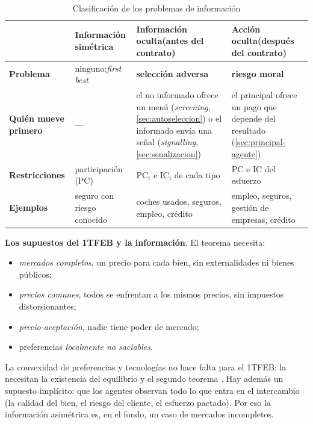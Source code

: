 \documentclass[11pt]{article}
\begin{document}
\begin{table}[H]
\centering
\caption{Clasificación de los problemas de información}\label{tab:clasificacion-informacion}
\begin{tabular}{>{\centering\arraybackslash}m{2.6cm}>{\centering\arraybackslash}m{3.4cm}>{\centering\arraybackslash}m{4.4cm}>{\centering\arraybackslash}m{4.4cm}}
\toprule
\rowcolor{tceeazulpalido} & \textbf{Información simétrica} & \textbf{Información oculta}\newline (antes del contrato) & \textbf{Acción oculta}\newline (después del contrato)\\
\midrule
\textbf{Problema} & ninguno:\newline \emph{first best} & \cellcolor{tceesalvia}\textcolor{tceeverde}{\textbf{selección adversa}} & \cellcolor{tceesalvia}\textcolor{tceedorado}{\textbf{riesgo moral}}\\
\addlinespace[0.3em]
\textbf{Quién mueve primero} & --- & el no informado ofrece un menú (\emph{screening}, \ref{sec:autoseleccion}) o el informado envía una señal (\emph{signalling}, \ref{sec:senalizacion}) & el principal ofrece un pago que depende del resultado (\ref{sec:principal-agente})\\
\addlinespace[0.3em]
\textbf{Restricciones} & participación (PC) & $\mathrm{PC}_i$ e $\mathrm{IC}_i$ de cada tipo & PC e IC del esfuerzo\\
\addlinespace[0.3em]
\textbf{Ejemplos} & seguro con riesgo conocido & coches usados, seguros, empleo, crédito & empleo, seguros, gestión de empresas, crédito\\
\bottomrule
\end{tabular}
\end{table}

\begin{anotaciones}
\textbf{Los supuestos del 1TFEB y la información}. El teorema necesita\nocite{MasColellWhinstonGreen1995}:
\begin{itemize}
\item \emph{mercados completos}, un precio para cada bien, sin externalidades ni bienes públicos;
\item \emph{precios comunes}, todos se enfrentan a los mismos precios, sin impuestos distorsionantes;
\item \emph{precio-aceptación}, nadie tiene poder de mercado;
\item preferencias \emph{localmente no saciables}.
\end{itemize}
La convexidad de preferencias y tecnologías no hace falta para el 1TFEB: la necesitan la existencia del equilibrio y el segundo teorema  . Hay además un supuesto implícito: que los agentes observan todo lo que entra en el intercambio (la calidad del bien, el riesgo del cliente, el esfuerzo pactado). Por eso la información asimétrica es, en el fondo, un caso de mercados incompletos.
\end{anotaciones}
\end{document}

